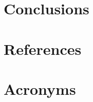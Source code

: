 \documentclass[DM,authoryear,toc]{lsstdoc}
\begin{document}
\section{Conclusions}

\appendix
\section{References} \label{sec:bib}
\renewcommand{\refname}{} %


\section{Acronyms} \label{sec:acronyms}

\end{document}
